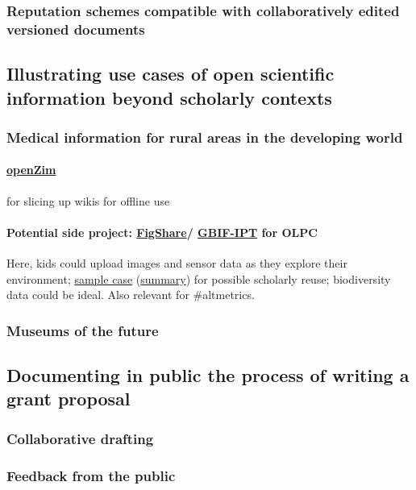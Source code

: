 \documentclass[final,authoryear,3p]{elsarticle-open-drafting}
\begin{document}
\subsubsection{Reputation schemes compatible with collaboratively edited versioned documents}
\subsection{Illustrating use cases of open scientific information beyond scholarly contexts}
\subsubsection{Medical information for rural areas in the developing world}
\paragraph{\href{http://www.openzim.org}{openZim}} for slicing up wikis for offline use
\paragraph{Potential side project: \href{http://figshare.com/}{FigShare}/ \href{http://www.gbif.org/communications/news-and-events/showsingle/article/new-incentive-for-biodiversity-data-publishing/}{GBIF-IPT} for OLPC} 
Here, kids could upload images and sensor data as they explore their environment; \href{http://dx.doi.org/10.3897/zookeys.89.903}{sample case} (\href{http://www.eurekalert.org/pub_releases/2011-05/pp-snh051711.php}{summary}) for possible scholarly reuse; biodiversity data could be ideal. Also relevant for \#altmetrics.
\subsubsection{Museums of the future}
\subsection{Documenting in public the process of writing a grant proposal}
\subsubsection{Collaborative drafting}
\subsubsection{Feedback from the public}
\end{document}
